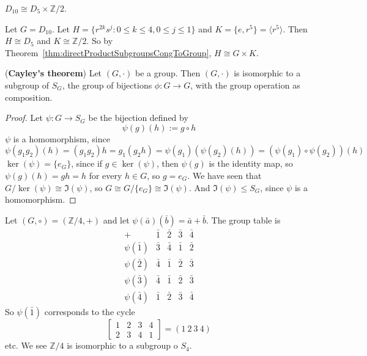 \begin{example}
	$D_{10} \cong D_5 \times \mathbb{Z} / 2$.

	Let $G = D_{10}$. Let $H = \{ r^{2k} s^j: 0 \le k \le 4, 0 \le j \le 1 \}$ and $K = \{ e, r^5 \} = \langle r^5 \rangle$. Then $H \cong D_5$ and $K \cong \mathbb{Z} / 2$. So by Theorem~\ref{thm:directProductSubgroupsCongToGroup}, $H \cong G \times K$.
\end{example}

\begin{theorem}
	(\textbf{Cayley's theorem}) Let $(G, \cdot)$ be a group. Then $(G, \cdot)$ is isomorphic to a subgroup of $S_G$, the group of bijections $\phi: G \rightarrow G$, with the group operation as composition.
\end{theorem}

\begin{proof}
	Let $\psi: G \rightarrow S_G$ be the bijection defined by
	\[
		\psi(g)(h) := g \circ h
	\]
	$\psi$ is a homomorphism, since
	\[
		\psi(g_1 g_2)(h) = (g_1 g_2) h = g_1 (g_2 h) = \psi(g_1)(\psi(g_2)(h)) = (\psi(g_1) \circ \psi(g_2)) (h)
	\]
	$\ker(\psi) = \{ e_G \}$, since if $g \in \ker(\psi)$, then $\psi(g)$ is the identity map, so $\psi(g)(h) = gh = h$ for every $h \in G$, so $g = e_G$. We have seen that $G / \ker(\psi) \cong \Im(\psi)$, so $G \cong G / \{ e_G \} \cong \Im(\psi)$. And $\Im(\psi) \le S_G$, since $\psi$ is a homomorphism.
\end{proof}

\begin{example}
	Let $(G, \circ) = (\mathbb{Z} / 4, +)$ and let $\psi(\bar{a})(\bar{b}) = \bar{a} + \bar{b}$. The group table is
	\[
		\begin{matrix}
			+ & \bar{1} & \bar{2} & \bar{3} & \bar{4} \\
			\psi(\bar{1}) & \bar{3} & \bar{4} & \bar{1} & \bar{2} \\
			\psi(\bar{2}) & \bar{4} & \bar{1} & \bar{2} & \bar{3} \\
			\psi(\bar{3}) & \bar{4} & \bar{1} & \bar{2} & \bar{3} \\
			\psi(\bar{4}) & \bar{1} & \bar{2} & \bar{3} & \bar{4}
		\end{matrix}
	\]
	So $\psi(\bar{1})$ corresponds to the cycle
	\[
		\begin{bmatrix}
			1 & 2 & 3 & 4 \\
			2 & 3 & 4 & 1
		\end{bmatrix}
		= (1 \ 2 \ 3 \ 4)
	\]
	etc. We see $\mathbb{Z} / 4$ is isomorphic to a subgroup o $S_4$.
\end{example}

